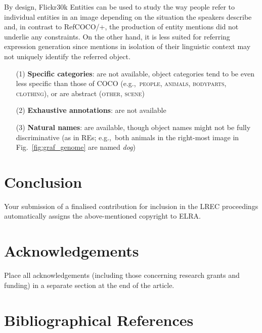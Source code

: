 \documentclass[10pt, a4paper]{article}
\newcommand{\refexp}[1]{\textsl{#1}}
\newcommand{\cat}[1]{\textsc{#1}}
\newcommand{\refcoco}{RefCOCO\xspace}
\newcommand{\flickr}{Flickr30k Entities\xspace}
\begin{document}
By design, \flickr can be used to study the way people refer to individual entities in an image depending on the situation the speakers describe and,  
in contrast to \refcoco/+, the production of entity mentions did not underlie any constraints. 
On the other hand, it is less suited for referring expression generation since mentions in isolation of their linguistic context may not uniquely identify the referred object. 

\begin{itemize}
     		\item[(1)] \textbf{Specific categories}: are not available, object categories tend to be even less specific than those of COCO (e.g.,~\cat{people, animals, bodyparts, clothing}), or are abstract (\cat{other, scene})
		\item[(2)] \textbf{Exhaustive annotations}: are not available
		   \item[(3)] \textbf{Natural names}: are available, though object names might not be fully discriminative (as in REs; e.g.,~both animals in the right-most image in Fig.~\ref{fig:graf_genome} are named \refexp{dog})

\end{itemize}



\section{Conclusion}

Your submission of a finalised contribution for inclusion in the LREC
proceedings automatically assigns the above-mentioned copyright to ELRA.


\section{Acknowledgements}

Place all acknowledgements (including those concerning research grants and
funding) in a separate section at the end of the article.

\section{Bibliographical References}
\label{main:ref}





\end{document}
